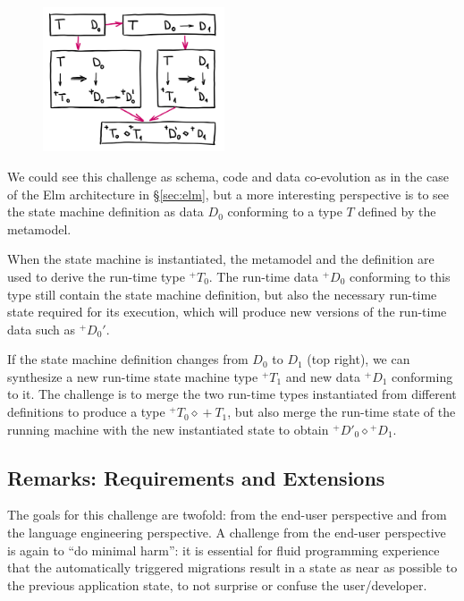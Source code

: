 \documentclass[english,submission]{programming}
\DeclareRobustCommand{\frameworkbox}[1]{\leftbar#1\endleftbar}
\newcommand{\frameworkboxtitle}[1]{\noindent{\firamedium #1.}\quad}
\begin{document}
\frameworkbox{
\begin{figure}
\vspace{-0.75em}
\includegraphics[width=14.5em]{figures/arr-model.png}
\vspace{-1.5em}
\end{figure}
\frameworkboxtitle{Code as Data Migrations}
We could see this challenge as schema, code and data co-evolution as in the case of the Elm
architecture in \S\ref{sec:elm}, but a more interesting perspective is to see the
state machine definition as data $D_0$ conforming to a type $T$ defined by the metamodel.

When the state machine is instantiated, the metamodel and the definition are used to derive
the run-time type ${}^+\!T_0$. The run-time data ${}^+\!D_0$ conforming to this type still
contain the state machine definition, but also the necessary run-time state required for
its execution, which will produce new versions of the run-time data such as ${}^+\!D_0'$.

If the state machine definition changes from $D_0$ to $D_1$ (top right), we can synthesize
a new run-time state machine type ${}^+\!T_1$ and new data ${}^+\!D_1$ conforming to it.
The challenge is to merge the two run-time types instantiated from different definitions
to produce a type ${}^+\!T_0 \diamond {}+\!T_1$, but also merge the run-time state of the
running machine with the new instantiated state to obtain ${}^+\!D'_0 \diamond {}^+\!D_1$.
}

\subsection*{Remarks: Requirements and Extensions}

The goals for this challenge are twofold: from the end-user perspective and from the language engineering perspective. A challenge from the end-user perspective is again to ``do minimal harm'': it is essential for fluid programming experience that the automatically triggered migrations result in a state as near as possible to the previous application state, to not surprise or confuse the user/developer.
\end{document}
